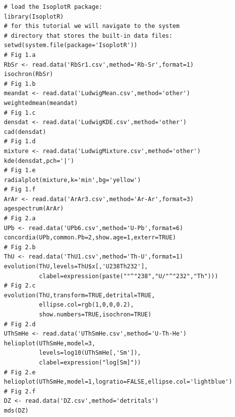 \documentclass{article}
\begin{document}
\begin{verbatim}
# load the IsoplotR package:
library(IsoplotR)
# for this tutorial we will navigate to the system 
# directory that stores the built-in data files:
setwd(system.file(package='IsoplotR'))
# Fig 1.a
RbSr <- read.data('RbSr1.csv',method='Rb-Sr',format=1)
isochron(RbSr)
# Fig 1.b
meandat <- read.data('LudwigMean.csv',method='other')
weightedmean(meandat)
# Fig 1.c
densdat <- read.data('LudwigKDE.csv',method='other')
cad(densdat)
# Fig 1.d
mixture <- read.data('LudwigMixture.csv',method='other')
kde(densdat,pch='|')
# Fig 1.e
radialplot(mixture,k='min',bg='yellow')
# Fig 1.f
ArAr <- read.data('ArAr3.csv',method='Ar-Ar',format=3)
agespectrum(ArAr)
# Fig 2.a
UPb <- read.data('UPb6.csv',method='U-Pb',format=6)
concordia(UPb,common.Pb=2,show.age=1,exterr=TRUE)
# Fig 2.b
ThU <- read.data('ThU1.csv',method='Th-U',format=1)
evolution(ThU,levels=ThU$x[,'U238Th232'],
          clabel=expression(paste(""^"238","U/"^"232","Th")))
# Fig 2.c
evolution(ThU,transform=TRUE,detrital=TRUE,
          ellipse.col=rgb(1,0,0,0.2),
          show.numbers=TRUE,isochron=TRUE)
# Fig 2.d
UThSmHe <- read.data('UThSmHe.csv',method='U-Th-He')
helioplot(UThSmHe,model=3,
          levels=log10(UThSmHe[,'Sm']),
          clabel=expression("log[Sm]"))
# Fig 2.e
helioplot(UThSmHe,model=1,logratio=FALSE,ellipse.col='lightblue')
# Fig 2.f
DZ <- read.data('DZ.csv',method='detritals')
mds(DZ)
\end{verbatim}


%
%
\end{document}
